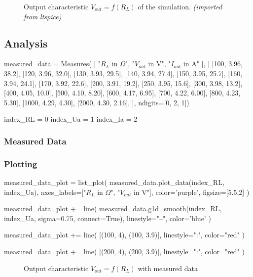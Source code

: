 \begin{figure}[H]
    \centering
    \caption{Output characteristic \textbf{$V_{out} = f(R_L)$} of the simulation. \textit{(imported from ltspice)}}
\end{figure}

\subsection{Analysis}

\begin{sagesilent}
    measured_data = Measures(
        [
            "$R_L$ in $\Omega$",
            "$V_{out}$ in V", 
            "$I_{out}$ in A"
        ], [
            [100, 3.96, 38.2],
            [120, 3.96, 32.0],
            [130, 3.93, 29.5],
            [140, 3.94, 27.4],
            [150, 3.95, 25.7],
            [160, 3.94, 24.1],
            [170, 3.92, 22.6],
            [200, 3.91, 19.2],
            [250, 3.95, 15.6],
            [300, 3.98, 13.2],
            [400, 4.05, 10.0],
            [500, 4.10, 8.20],
            [600, 4.17, 6.95],
            [700, 4.22, 6.00],
            [800, 4.23, 5.30],
            [1000, 4.29, 4.30],
            [2000, 4.30, 2.16],
    ], ndigits=[0, 2, 1])

    index_RL = 0
    index_Ua = 1
    index_Ia = 2
\end{sagesilent}

\subsubsection{Measured Data}

\begin{table}[H]
    \centering
    \renewcommand{\arraystretch}{1.2}
\end{table}

\subsubsection{Plotting}

\begin{sagesilent}
    measured_data_plot = list_plot(
        measured_data.plot_data(index_RL, index_Ua),
        axes_labels=["$R_L$ in $\Omega$", "$V_{out}$ in V"],
        color='purple',
        figsize=[5.5,2]
    )

    measured_data_plot += line(
        measured_data.g1d_smooth(index_RL, index_Ua, sigma=0.75, connect=True),
        linestyle="--",
        color='blue'
    )

    measured_data_plot += line(
        [(100, 4), (100, 3.9)],
        linestyle=":",
        color="red"
    )

    measured_data_plot += line(
        [(200, 4), (200, 3.9)],
        linestyle=":",
        color="red"
    )
\end{sagesilent}

\begin{figure}[H]
    \centering
    \caption{Output characteristic \textbf{$V_{out} = f(R_L)$} with measured data}
\end{figure}